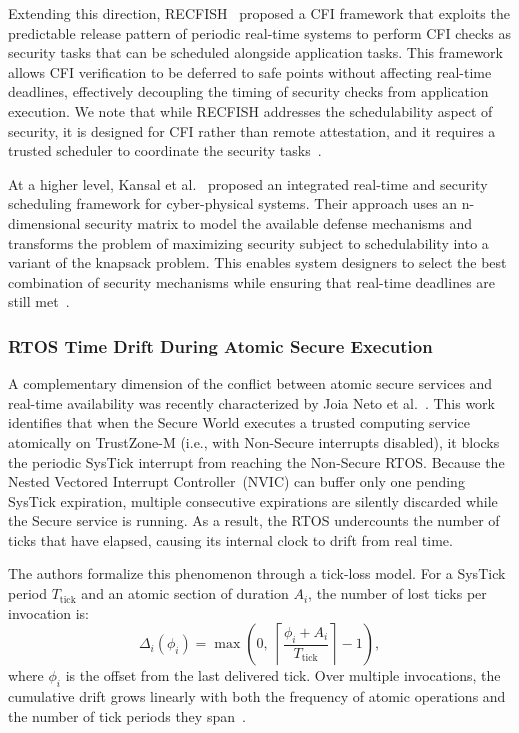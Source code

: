 \documentclass[a4paper,10pt]{article}
\begin{document}
Extending this direction, RECFISH~\cite{mishra2023procrastinating} proposed a CFI framework that exploits the predictable release pattern of periodic real-time systems to perform CFI checks as security tasks that can be scheduled alongside application tasks. This framework allows CFI verification to be deferred to safe points without affecting real-time deadlines, effectively decoupling the timing of security checks from application execution. We note that while RECFISH addresses the schedulability aspect of security, it is designed for CFI rather than remote attestation, and it requires a trusted scheduler to coordinate the security tasks~\cite{mishra2023procrastinating}.

At a higher level, Kansal et al.~\cite{kansal2023integrated} proposed an integrated real-time and security scheduling framework for cyber-physical systems. Their approach uses an n-dimensional security matrix to model the available defense mechanisms and transforms the problem of maximizing security subject to schedulability into a variant of the knapsack problem. This enables system designers to select the best combination of security mechanisms while ensuring that real-time deadlines are still met~\cite{kansal2023integrated}.


\subsubsection{RTOS Time Drift During Atomic Secure Execution}

A complementary dimension of the conflict between atomic
secure services and real-time availability was recently
characterized by Joia Neto et al.~\cite{joianeto2026iccad}.
This work identifies that when the Secure World executes a
trusted computing service atomically on TrustZone-M (i.e.,
with Non-Secure interrupts disabled), it blocks the periodic
SysTick interrupt from reaching the Non-Secure RTOS.
Because the Nested Vectored Interrupt Controller~(NVIC) can
buffer only one pending SysTick expiration, multiple
consecutive expirations are silently discarded while the
Secure service is running. As a result, the RTOS undercounts
the number of ticks that have elapsed, causing its internal
clock to drift from real time.

The authors formalize this phenomenon through a tick-loss
model. For a SysTick period $T_{\mathrm{tick}}$ and an atomic
section of duration $A_i$, the number of lost ticks per
invocation is:
\begin{equation}
    \Delta_i(\phi_i) = \max\left(0,\;
    \left\lceil\frac{\phi_i + A_i}{T_{\mathrm{tick}}}\right\rceil
    - 1\right),
\end{equation}
where $\phi_i$ is the offset from the last delivered tick.
Over multiple invocations, the cumulative drift grows
linearly with both the frequency of atomic operations and
the number of tick periods they span~\cite{joianeto2026iccad}.
\end{document}
